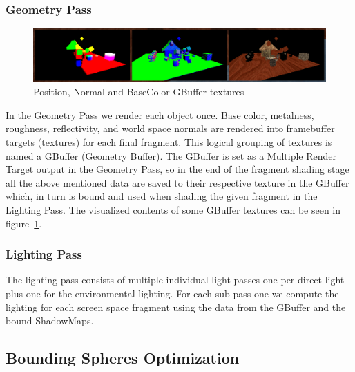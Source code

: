 \subsubsection{Geometry Pass}

\begin{figure}[ht]
    \centering
    \includegraphics[scale=0.3, clip=true]{./image/gbuffer.png}
    \caption{Position, Normal and BaseColor GBuffer textures}
\label{fig:gbuf}
\end{figure}

In the Geometry Pass we render each object once. Base color, metalness, roughness, reflectivity, and world space normals
are rendered into framebuffer targets (textures) for each final fragment. This logical grouping of textures is named
a GBuffer (Geometry Buffer). The GBuffer is set as a Multiple Render Target output in the Geometry Pass, so in the end
of the fragment shading stage all the above mentioned data are saved to their respective texture in the GBuffer which,
in turn is bound and used when shading the given fragment in the Lighting Pass. The visualized contents of some GBuffer
textures can be seen in figure~\ref{fig:gbuf}.


\subsubsection{Lighting Pass}
The lighting pass consists of multiple individual light passes one per direct light plus one for the
environmental lighting. For each sub-pass one we compute the lighting for each screen space fragment using
the data from the GBuffer and the bound ShadowMaps.

\subsection{Bounding Spheres Optimization}
